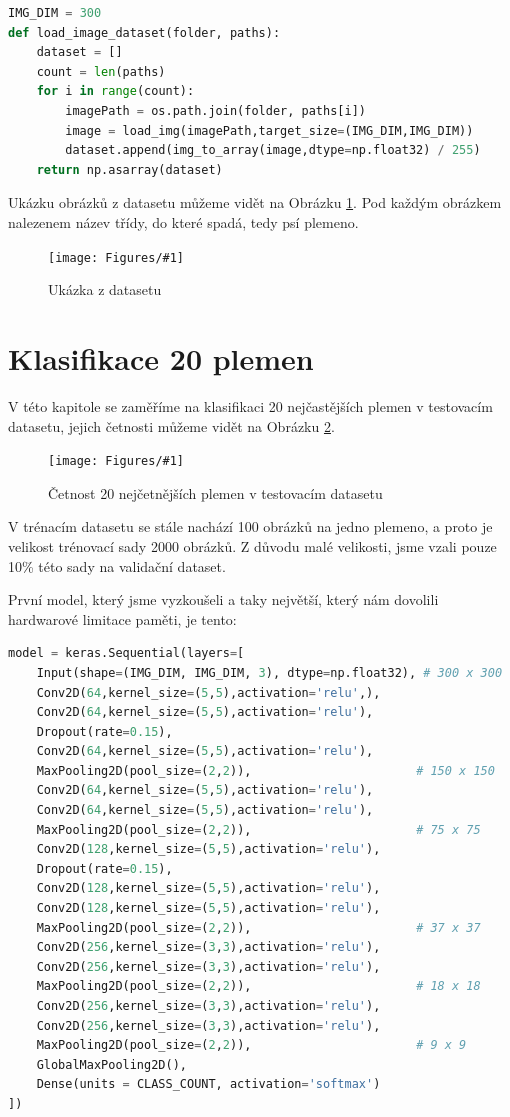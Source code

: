 \documentclass[a4paper,12pt]{article}
\newcommand{\image}[4]{\begin{figure}[ht!] \centering \texttt{[image: Figures/\#1]} \caption{#2} \label{#3} \end{figure}}
\begin{document}
\begin{lstlisting}[language=Python]
IMG_DIM = 300
def load_image_dataset(folder, paths):
    dataset = []
    count = len(paths)
    for i in range(count):
        imagePath = os.path.join(folder, paths[i])
        image = load_img(imagePath,target_size=(IMG_DIM,IMG_DIM))
        dataset.append(img_to_array(image,dtype=np.float32) / 255)
    return np.asarray(dataset)
\end{lstlisting}


Ukázku obrázků z datasetu můžeme vidět na Obrázku \ref{fig:dataset_example}. Pod každým obrázkem nalezenem název třídy, do které spadá, tedy psí plemeno.

\image{datasat_example.pdf}{Ukázka z datasetu}{fig:dataset_example}{1.0}

\newpage
\section{Klasifikace 20 plemen}
V této kapitole se zaměříme na klasifikaci 20 nejčastějších plemen v testovacím datasetu, jejich četnosti můžeme vidět na Obrázku \ref{fig:t20_test_dist}.
\image{t20_test_breeds.pdf}{Četnost 20 nejčetnějších plemen v testovacím datasetu}{fig:t20_test_dist}{1}
V trénacím datasetu se stále nachází 100 obrázků na jedno plemeno, a proto je velikost trénovací sady 2000 obrázků. Z důvodu malé velikosti, jsme vzali pouze 
10\% této sady na validační dataset.

První model, který jsme vyzkoušeli a taky největší, který nám dovolili hardwarové limitace paměti, je tento:
\begin{lstlisting}[language=Python]
model = keras.Sequential(layers=[
    Input(shape=(IMG_DIM, IMG_DIM, 3), dtype=np.float32), # 300 x 300
    Conv2D(64,kernel_size=(5,5),activation='relu',),
    Conv2D(64,kernel_size=(5,5),activation='relu'),
    Dropout(rate=0.15),
    Conv2D(64,kernel_size=(5,5),activation='relu'),       
    MaxPooling2D(pool_size=(2,2)),                       # 150 x 150  
    Conv2D(64,kernel_size=(5,5),activation='relu'),
    Conv2D(64,kernel_size=(5,5),activation='relu'),
    MaxPooling2D(pool_size=(2,2)),                       # 75 x 75
    Conv2D(128,kernel_size=(5,5),activation='relu'),
    Dropout(rate=0.15),
    Conv2D(128,kernel_size=(5,5),activation='relu'),
    Conv2D(128,kernel_size=(5,5),activation='relu'),
    MaxPooling2D(pool_size=(2,2)),                       # 37 x 37  
    Conv2D(256,kernel_size=(3,3),activation='relu'),
    Conv2D(256,kernel_size=(3,3),activation='relu'),
    MaxPooling2D(pool_size=(2,2)),                       # 18 x 18
    Conv2D(256,kernel_size=(3,3),activation='relu'),
    Conv2D(256,kernel_size=(3,3),activation='relu'),
    MaxPooling2D(pool_size=(2,2)),                       # 9 x 9
    GlobalMaxPooling2D(),
    Dense(units = CLASS_COUNT, activation='softmax')
])
\end{lstlisting}
\end{document}
